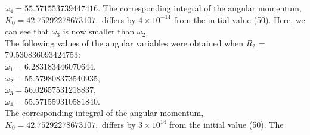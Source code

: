 \documentclass[fontsize = 11pt,a4paper]{article}
\begin{document}
\begin{multicols}{2}
$\omega_4 = 55.571553739447416.$
The corresponding integral of the angular momentum, \\
$K_0 = 42.75292278673107,$
differs by $4 \times {10}^{-14}$ from the initial value (50). Here,
we can see that $\omega_3$ is now smaller than $\omega_2$\\
The following values of the angular variables were
obtained when $R_2$ = 79.530836093424753:\\
$\omega_1 = 6.283183446070644,$\\
$\omega_2 = 55.579808373540935,$\\
$\omega_3 =56.02657531218837,$\\
$\omega_4 = 55.571559310581840.$\\
The corresponding integral of the angular momentum, \\
$K_0 = 42.75292278673107,$
differs by $3 \times {10}^{14}$ from the initial value (50). The\\
\end{multicols}
\pagebreak
\end{document}
